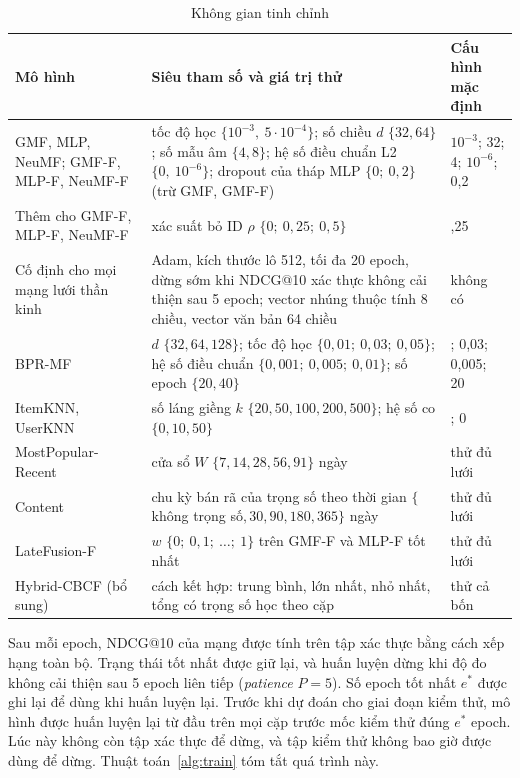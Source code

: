 \begin{table}[H]
    \centering\small
    \caption{Không gian tinh chỉnh}
    \label{tab:hyperparams}
    \begin{tabularx}{\textwidth}{|>{\raggedright\arraybackslash}p{3.5cm}|>{\raggedright\arraybackslash}X|>{\raggedright\arraybackslash}p{2.7cm}|}
        \hline
        Mô hình & Siêu tham số và giá trị thử & Cấu hình mặc định \\
        \hline
        GMF, MLP, NeuMF; GMF-F, MLP-F, NeuMF-F & tốc độ học $\{10^{-3},\ 5\cdot 10^{-4}\}$; số chiều $d$ $\{32, 64\}$; số mẫu âm $\{4, 8\}$; hệ số điều chuẩn L2 $\{0,\ 10^{-6}\}$; dropout của tháp MLP $\{0;\ 0{,}2\}$ (trừ GMF, GMF-F) & $10^{-3}$; 32; 4; $10^{-6}$; 0,2 \\ \hline
        Thêm cho GMF-F, MLP-F, NeuMF-F & xác suất bỏ ID $\rho$ $\{0;\ 0{,}25;\ 0{,}5\}$ & 0,25 \\ \hline
        Cố định cho mọi mạng lưới thần kinh & Adam, kích thước lô 512, tối đa 20 epoch, dừng sớm khi NDCG@10 xác thực không cải thiện sau 5 epoch; vector nhúng thuộc tính 8 chiều, vector văn bản 64 chiều & không có \\ \hline
        BPR-MF & $d$ $\{32, 64, 128\}$; tốc độ học $\{0{,}01;\ 0{,}03;\ 0{,}05\}$; hệ số điều chuẩn $\{0{,}001;\ 0{,}005;\ 0{,}01\}$; số epoch $\{20, 40\}$ & 32; 0,03; 0,005; 20 \\ \hline
        ItemKNN, UserKNN & số láng giềng $k$ $\{20, 50, 100, 200, 500\}$; hệ số co $\{0, 10, 50\}$ & 100; 0 \\ \hline
        MostPopular-Recent & cửa sổ $W$ $\{7, 14, 28, 56, 91\}$ ngày & thử đủ lưới \\ \hline
        Content & chu kỳ bán rã của trọng số theo thời gian $\{$không trọng số$, 30, 90, 180, 365\}$ ngày & thử đủ lưới \\ \hline
        LateFusion-F & $w$ $\{0;\ 0{,}1;\ \dots;\ 1\}$ trên GMF-F và MLP-F tốt nhất & thử đủ lưới \\ \hline
        Hybrid-CBCF (bổ sung) & cách kết hợp: trung bình, lớn nhất, nhỏ nhất, tổng có trọng số học theo cặp & thử cả bốn \\
        \hline
    \end{tabularx}
\end{table}

Sau mỗi epoch, NDCG@10 của mạng được tính trên tập xác thực bằng cách xếp hạng toàn bộ. Trạng thái tốt nhất được giữ lại, và huấn luyện dừng khi độ đo không cải thiện sau 5 epoch liên tiếp (\textit{patience} $P = 5$). Số epoch tốt nhất $e^*$ được ghi lại để dùng khi huấn luyện lại. Trước khi dự đoán cho giai đoạn kiểm thử, mô hình được huấn luyện lại từ đầu trên mọi cặp trước mốc kiểm thử đúng $e^*$ epoch. Lúc này không còn tập xác thực để dừng, và tập kiểm thử không bao giờ được dùng để dừng. Thuật toán~\ref{alg:train} tóm tắt quá trình này.

